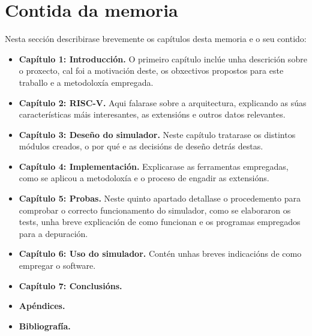 \section{Contida da memoria}
\label{sec:contido_memoria}
Nesta sección describirase brevemente os capítulos desta memoria e o seu contido: 
\begin{itemize}
    \item \textbf{Capítulo 1: Introducción.}  O primeiro capítulo inclúe unha descrición sobre o proxecto, cal foi a motivación deste, os obxectivos propostos para este traballo e a metodoloxía empregada.
    \item \textbf{Capítulo 2: RISC-V.} Aqui falarase sobre a arquitectura, explicando as súas características máis interesantes, as extensións e outros datos relevantes.
    \item \textbf{Capítulo 3: Deseño do simulador.} Neste capítulo tratarase os distintos módulos creados, o por qué e as decisións de deseño detrás destas.
    \item \textbf{Capítulo 4: Implementación.} Explicarase as ferramentas empregadas, como se aplicou a metodoloxía e o proceso de engadir as extensións.
    \item \textbf{Capítulo 5: Probas.} Neste quinto apartado detallase o procedemento para comprobar o correcto funcionamento do simulador, como se elaboraron os tests, unha breve explicación de como funcionan e os programas empregados para a depuración.
    \item \textbf{Capítulo 6: Uso do simulador.} Contén unhas breves indicacións de como empregar o software.
    \item \textbf{Capítulo 7: Conclusións.}
    \item \textbf{Apéndices. }
    \item \textbf{Bibliografía. }
    
\end{itemize}

